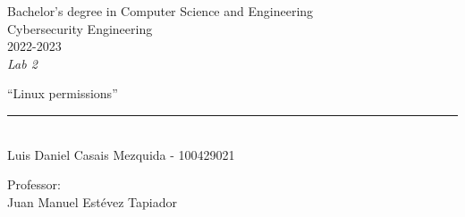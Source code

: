 \begin{titlepage}
    \begin{sffamily}
    \color{azulUC3M}
    \begin{center}
        \begin{figure}[H]
        \end{figure}
        \vspace{1.5cm}
        \begin{Large}
            Bachelor's degree in Computer Science and Engineering\\
            Cybersecurity Engineering\\
            2022-2023\\
            \vspace{2cm}
            \textsl{Lab 2}
            \bigskip

        \end{Large}
            {\Huge ``Linux permissions''}\\
            \vspace*{0.5cm}
            \rule{10.5cm}{0.1mm}\\
            \vspace*{0.9cm}
            {\LARGE Luis Daniel Casais Mezquida - 100429021}\\
            \vspace*{0.2cm}

            \vspace*{0.8cm}
        \begin{Large}
            Professor:\\
            Juan Manuel Estévez Tapiador\\
        \end{Large}
    \end{center}
    \vfill

    \end{sffamily}
\end{titlepage}
